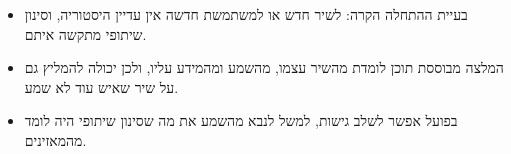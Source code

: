\begin{inshort}
\begin{itemize}
  \item בעיית ההתחלה הקרה: לשיר חדש או למשתמשת חדשה אין עדיין היסטוריה, וסינון שיתופי מתקשה איתם.
  \item המלצה מבוססת תוכן לומדת מהשיר עצמו, מהשמע ומהמידע עליו, ולכן יכולה להמליץ גם על שיר שאיש עוד לא שמע.
  \item בפועל אפשר לשלב גישות, למשל לנבא מהשמע את מה שסינון שיתופי היה לומד מהמאזינים.
\end{itemize}
\end{inshort}
